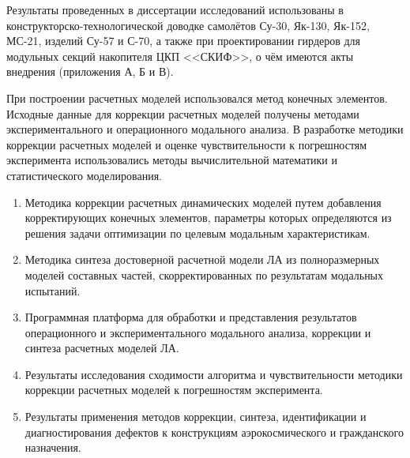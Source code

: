 Результаты проведенных в диссертации исследований использованы в конструкторско-технологической доводке самолётов Су-30, Як-130, Як-152, МС-21, изделий Су-57 и С-70, а также при проектировании гирдеров для модульных секций накопителя ЦКП <<СКИФ>>, о чём имеются акты внедрения (приложения А, Б и В).

{\methods}

При построении расчетных моделей использовался метод конечных элементов. Исходные данные для коррекции расчетных моделей получены методами экспериментального и операционного модального анализа. В разработке методики коррекции расчетных моделей и оценке чувствительности к погрешностям эксперимента использовались методы вычислительной математики и статистического моделирования. 

{}
\begin{enumerate}[beginpenalty = 10000] 
	\item Методика коррекции расчетных динамических моделей путем добавления корректирующих конечных элементов, параметры которых определяются из решения задачи оптимизации по целевым модальным характеристикам.
	\item Методика синтеза достоверной расчетной модели ЛА из полноразмерных моделей составных частей, скорректированных по результатам модальных испытаний.
	\item Программная платформа для обработки и представления результатов операционного и экспериментального модального анализа, коррекции и синтеза расчетных моделей ЛА.
	\item Результаты исследования сходимости алгоритма и чувствительности методики коррекции расчетных моделей к погрешностям эксперимента. 
	\item Результаты применения методов коррекции, синтеза, идентификации и диагностирования дефектов к конструкциям аэрокосмического и гражданского назначения.
\end{enumerate}

{\reliability} 


